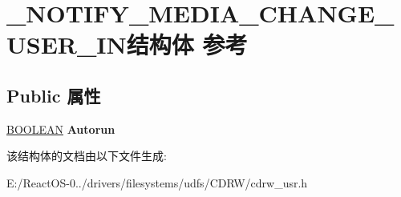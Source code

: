 \hypertarget{struct___n_o_t_i_f_y___m_e_d_i_a___c_h_a_n_g_e___u_s_e_r___i_n}{}\section{\+\_\+\+N\+O\+T\+I\+F\+Y\+\_\+\+M\+E\+D\+I\+A\+\_\+\+C\+H\+A\+N\+G\+E\+\_\+\+U\+S\+E\+R\+\_\+\+I\+N结构体 参考}
\label{struct___n_o_t_i_f_y___m_e_d_i_a___c_h_a_n_g_e___u_s_e_r___i_n}
\subsection*{Public 属性}
\begin{DoxyCompactItemize}
\item 
\mbox{\label{struct___n_o_t_i_f_y___m_e_d_i_a___c_h_a_n_g_e___u_s_e_r___i_n_a4771853d01890a341a020c1c7c0b39a2}} 
\hyperlink{_processor_bind_8h_a112e3146cb38b6ee95e64d85842e380a}{B\+O\+O\+L\+E\+AN} {\bfseries Autorun}
\end{DoxyCompactItemize}


该结构体的文档由以下文件生成\+:\begin{DoxyCompactItemize}
\item 
E\+:/\+React\+O\+S-\/0../drivers/filesystems/udfs/\+C\+D\+R\+W/cdrw\+\_\+usr.\+h\end{DoxyCompactItemize}
